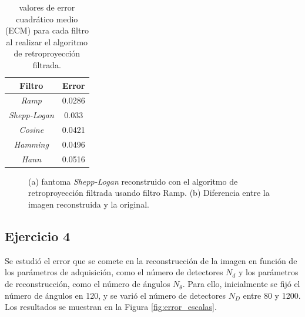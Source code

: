 \documentclass[11pt, twocolumn]{article}
\begin{document}
\begin{table}[H]
    \centering
    \begin{tabular}{|c|c|}
    \hline
    \textbf{Filtro} & \textbf{Error} \\ \hline
    \textit{Ramp}             & 0.0286           \\ \hline
    \textit{Shepp-Logan}             & 0.033           \\ \hline
    \textit{Cosine}             & 0.0421           \\ \hline
    \textit{Hamming}             & 0.0496           \\ \hline
    \textit{Hann}             & 0.0516           \\ \hline
    \end{tabular}
    \caption{valores de error cuadrático medio (ECM) para cada filtro al realizar el algoritmo de retroproyección filtrada.}
    \label{tab:error}
  \end{table}

  \begin{figure}[H]
    \centering
    \hfill
    \hfill
    \caption{(a) fantoma \textit{Shepp-Logan} reconstruido con el algoritmo de retroproyección filtrada usando filtro Ramp. (b) Diferencia entre la imagen reconstruida y la original.}
    \label{fig:figuras_ej_3}
  \end{figure}

\subsection*{Ejercicio 4}
Se estudió el error que se comete en la reconstrucción de la imagen en función de los parámetros de adquisición, como el número de detectores $N_d$ y los parámetros de reconstrucción, como el número de ángulos $N_\theta$. Para ello, inicialmente se fijó el número de ángulos en 120, y se varió el número de detectores $N_D$ entre 80 y 1200. Los resultados se muestran en la Figura \ref{fig:error_escalas}.
\end{document}
